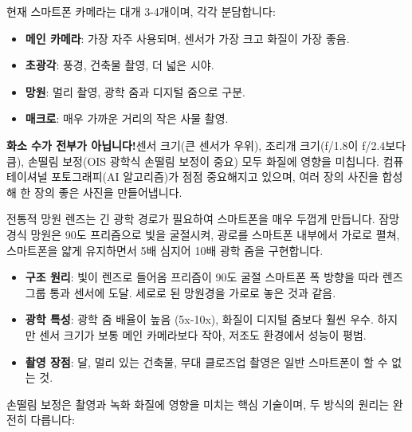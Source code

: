 
현재 스마트폰 카메라는 대개 3-4개이며, 각각 분담합니다:

\begin{itemize}
  \item \textbf{메인 카메라}: 가장 자주 사용되며, 센서가 가장 크고 화질이 가장 좋음.
  \item \textbf{초광각}: 풍경, 건축물 촬영, 더 넓은 시야.
  \item \textbf{망원}: 멀리 촬영, 광학 줌과 디지털 줌으로 구분.
  \item \textbf{매크로}: 매우 가까운 거리의 작은 사물 촬영.
\end{itemize}

\textbf{화소 수가 전부가 아닙니다!}센서 크기(큰 센서가 우위), 조리개 크기(f/1.8이 f/2.4보다 큼), 손떨림 보정(OIS 광학식 손떨림 보정이 중요) 모두 화질에 영향을 미칩니다. 컴퓨테이셔널 포토그래피(AI 알고리즘)가 점점 중요해지고 있으며, 여러 장의 사진을 합성해 한 장의 좋은 사진을 만들어냅니다.


전통적 망원 렌즈는 긴 광학 경로가 필요하여 스마트폰을 매우 두껍게 만듭니다. 잠망경식 망원은 90도 프리즘으로 빛을 굴절시켜, 광로를 스마트폰 내부에서 가로로 펼쳐, 스마트폰을 얇게 유지하면서 5배 심지어 10배 광학 줌을 구현합니다.

\begin{itemize}
  \item \textbf{구조 원리}: 빛이 렌즈로 들어옴 프리즘이 90도 굴절 스마트폰 폭 방향을 따라 렌즈 그룹 통과 센서에 도달. 세로로 된 망원경을 가로로 놓은 것과 같음.
  \item \textbf{광학 특성}: 광학 줌 배율이 높음 (5x-10x), 화질이 디지털 줌보다 훨씬 우수. 하지만 센서 크기가 보통 메인 카메라보다 작아, 저조도 환경에서 성능이 평범.
  \item \textbf{촬영 장점}: 달, 멀리 있는 건축물, 무대 클로즈업 촬영은 일반 스마트폰이 할 수 없는 것.
\end{itemize}


손떨림 보정은 촬영과 녹화 화질에 영향을 미치는 핵심 기술이며, 두 방식의 원리는 완전히 다릅니다:

